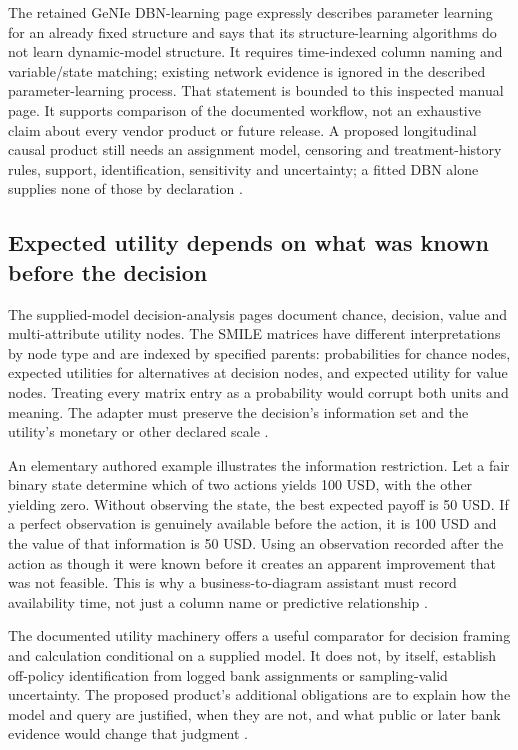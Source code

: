 The retained GeNIe DBN-learning page expressly describes parameter learning
for an already fixed structure and says that its structure-learning
algorithms do not learn dynamic-model structure. It requires time-indexed
column naming and variable/state matching; existing network evidence is
ignored in the described parameter-learning process. That statement is
bounded to this inspected manual page. It supports comparison of the
documented workflow, not an exhaustive claim about every vendor product or
future release. A proposed longitudinal causal product still needs an
assignment model, censoring and treatment-history rules, support,
identification, sensitivity and uncertainty; a fitted DBN alone supplies
none of those by declaration
\cite{exec13_ct_genie_learning,exec24_smile_choice}.

\subsection{Expected utility depends on what was known before the decision}
The supplied-model decision-analysis pages document chance, decision,
value and multi-attribute utility nodes. The SMILE matrices have different
interpretations by node type and are indexed by specified parents:
probabilities for chance nodes, expected utilities for alternatives at
decision nodes, and expected utility for value nodes. Treating every matrix
entry as a probability would corrupt both units and meaning. The adapter
must preserve the decision's information set and the utility's monetary
or other declared scale \cite{exec16_cp_bayesfusion}.

An elementary authored example illustrates the information restriction.
Let a fair binary state determine which of two actions yields 100 USD,
with the other yielding zero. Without observing the state, the best
expected payoff is 50 USD. If a perfect observation is genuinely available
before the action, it is 100 USD and the value of that information is
50 USD. Using an observation recorded after the action as though it were
known before it creates an apparent improvement that was not feasible.
This is why a business-to-diagram assistant must record availability time,
not just a column name or predictive relationship
\cite{exec24_smile_choice}.

The documented utility machinery offers a useful comparator for decision
framing and calculation conditional on a supplied model. It does not, by
itself, establish off-policy identification from logged bank assignments or
sampling-valid uncertainty. The proposed product's additional obligations
are to explain how the model and query are justified, when they are not,
and what public or later bank evidence would change that judgment
\cite{exec16_cp_bayesfusion,exec24_smile_choice}.

